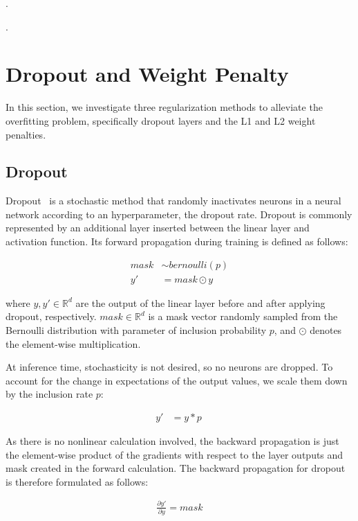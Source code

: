 \documentclass{article}
\begin{document}
\questionEleven.

\questionTwelve.





\section{Dropout and Weight Penalty}
\label{sec:task2.1} 

In this section, we investigate three regularization methods to 
alleviate the overfitting problem, specifically dropout layers 
and the L1 and L2 weight penalties.

\subsection{Dropout}

Dropout~\cite{srivastava2014dropout}
is a stochastic method that randomly inactivates
neurons in a neural network according to an hyperparameter, the
dropout rate. Dropout is commonly represented by an 
additional layer inserted between the linear layer and 
activation function.
Its forward propagation during training is defined as follows:

\begin{align}
    mask &\sim bernoulli(p)\\
    y' &= mask \odot y\
\end{align}

where $y, y' \in \mathbb{R}^d$ are the output of the linear layer 
before and after applying dropout, 
respectively. $mask \in \mathbb{R}^d$ is a mask vector randomly sampled from the
Bernoulli distribution with parameter of inclusion probability
$p$, and $\odot$ denotes the element-wise multiplication.

At inference time, stochasticity is not desired, so no neurons
are dropped. To account for the change in expectations of the
output values, we scale them down by the inclusion rate
$p$:

\begin{align}
    y' &= y*p\
\end{align}

As there is no nonlinear calculation involved, the backward
propagation is just the element-wise product of the gradients
with respect to the layer outputs and mask created
in the forward calculation. The backward propagation for
dropout is therefore formulated as follows:

\begin{align}
    \frac{\partial y'}{\partial y} = mask
\end{align}
\end{document}
